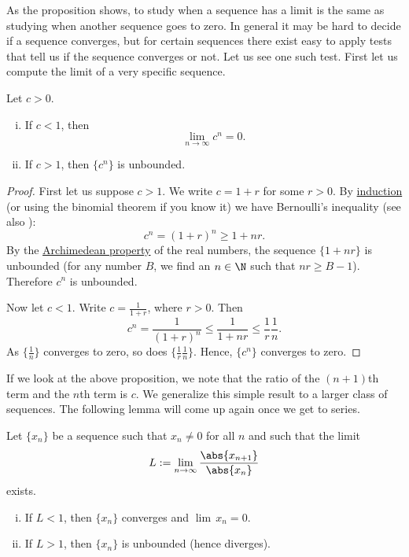 \documentclass[12pt]{book}
\begin{document}
As the proposition shows, to study when a sequence has a limit is 
the same as studying when another sequence goes to zero.
In general it may be hard to decide if a sequence converges, but
for certain sequences there exist easy to apply tests that tell us
if the sequence converges or not.
Let us see one such test.
First let
us compute the limit of a very specific sequence.
\begin{prop}
Let $c > 0$.
\begin{enumerate}[(i)]
\item
If $c < 1$, then
\begin{equation*}
\lim_{n\to\infty} c^n = 0.
\end{equation*}
\item
If $c > 1$, then $\{ c^n \}$ is unbounded.
\end{enumerate}
\end{prop}

\begin{proof}
First let us suppose $c > 1$.
We write
$c = 1+r$ for some $r > 0$.
By \hyperref[induction:thm]{induction} (or using the binomial theorem
if you know it) we have Bernoulli's inequality (see also
):
\begin{equation*}
c^n = {(1+r)}^n \geq 1+nr .
\end{equation*}
By the \hyperref[thm:arch:i]{Archimedean property}
of the real numbers, the sequence $\{ 1+nr \}$
is unbounded (for any number $B$, we find an $n \in \N$ such that $nr \geq
B-1$).
Therefore $c^n$ is unbounded.

Now let $c < 1$.
Write $c = \frac{1}{1+r}$, where $r > 0$.
Then
\begin{equation*}
c^n = \frac{1}{{(1+r)}^n} \leq
\frac{1}{1+nr} \leq \frac{1}{r} \frac{1}{n} .
\end{equation*}
As $\{ \frac{1}{n} \}$ converges to zero, so does
$\{ \frac{1}{r} \frac{1}{n} \}$.
Hence, $\{ c^n \}$ converges to zero.
\end{proof}

If we look at the above proposition, we note that the
ratio of the $(n+1)$th term and the $n$th term is $c$.
We 
generalize this simple result to a larger class of sequences.
The following lemma will come up again once we get to series.

\begin{lemma}
\label{seq:ratiotest}
Let $\{ x_n \}$ be a sequence such that $x_n \not= 0$ for all $n$ and such that
the limit
\begin{equation*}
L := \lim_{n\to\infty} \frac{\abs{x_{n+1}}}{\abs{x_n}}
\end{equation*}
exists.
\begin{enumerate}[(i)]
\item
If $L < 1$, then $\{ x_n \}$ converges and $\lim\, x_n = 0$.
\item
If $L > 1$, then $\{ x_n \}$ is unbounded (hence diverges).
\end{enumerate}
\end{lemma}
\end{document}
